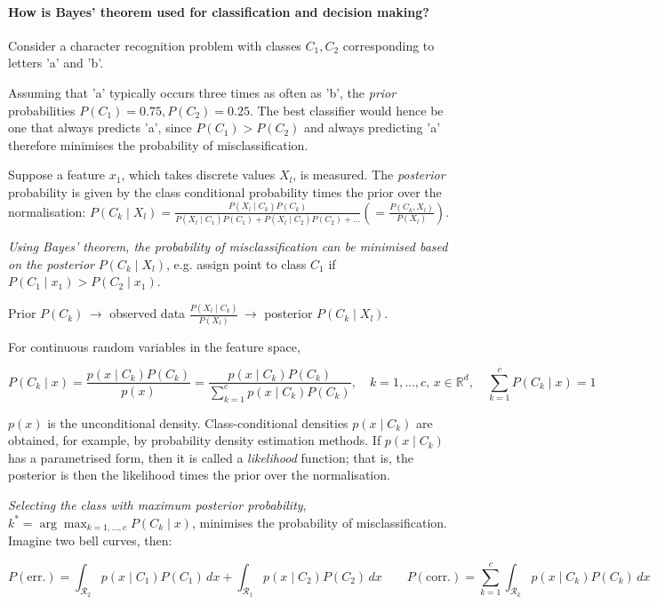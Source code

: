 \paragraph{How is Bayes' theorem used for classification and decision making?}

Consider a character recognition problem with classes $C_1, C_2$ corresponding to letters 'a' and 'b'.

Assuming that 'a' typically occurs three times as often as 'b',
the \textit{prior} probabilities $P(C_1) = 0.75, P(C_2) = 0.25$.
The best classifier would hence be one that always predicts 'a',
since $P(C_1) > P(C_2)$ and always predicting 'a' therefore minimises the probability of misclassification.

Suppose a feature $x_1$, which takes discrete values $X_l$, is measured.
The \textit{posterior} probability is given by the class conditional probability times the prior over the normalisation:
$P(C_k \mid X_l) = \frac{P(X_l \mid C_k) P(C_k)}{P(X_l \mid C_1) P(C_1) + P(X_l \mid C_2) P(C_2) + \dots} ( = \frac{P(C_k, X_l)}{P(X_l)})$.

\textit{Using Bayes' theorem, the probability of misclassification
can be minimised based on the posterior} $P(C_k \mid X_l)$,
e.g. assign point to class $C_1$ if $P(C_1 \mid x_1) > P(C_2 \mid x_1)$.

Prior $P(C_k) \, \rightarrow$ observed data $\frac{P(X_l \mid C_k)}{P(X_l)} \, \rightarrow$ posterior $P(C_k \mid X_l)$.

For continuous random variables in the feature space,

$$
P(C_k \mid x) = \frac{p(x \mid C_k) P(C_k)}{p(x)} = \frac{p(x \mid C_k) P(C_k)}{\sum_{k=1}^c{p(x \mid C_k) P(C_k)}}, \quad k = 1, \dots, c, \, x \in \mathbb{R}^d,
\quad \sum_{k=1}^c{P(C_k \mid x) = 1}
$$

$p(x)$ is the unconditional density.
Class-conditional densities $p(x \mid C_k)$ are obtained, for example, by probability density estimation methods.
If $p(x \mid C_k)$ has a parametrised form, then it is called a \textit{likelihood} function;
that is, the posterior is then the likelihood times the prior over the normalisation.

\textit{Selecting the class with maximum posterior probability},
$k^* = \arg\max_{k = 1, \dots, c}{P(C_k \mid x)}$,
minimises the probability of misclassification.
Imagine two bell curves, then:

$$
P(\text{err.})
= \int_{\mathcal{R}_2}{p(x \mid C_1) P(C_1) \, dx}
+ \int_{\mathcal{R}_1}{p(x \mid C_2) P(C_2) \, dx}
\qquad
P(\text{corr.}) = \sum_{k=1}^c{\int_{\mathcal{R}_k}{p(x \mid C_k) P(C_k) \, dx}}
$$

